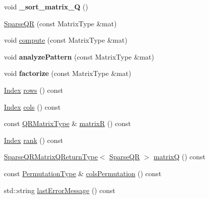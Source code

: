\begin{DoxyCompactItemize}
\mbox{\label{group___sparse_q_r___module_a056948dc591c1030164c2dda73664640}} 
void {\bfseries \+\_\+sort\+\_\+matrix\+\_\+Q} ()
\item 
\hyperlink{group___sparse_q_r___module_ac50f705d686d4bc687ce6acbc76447d2}{Sparse\+QR} (const Matrix\+Type \&mat)
\item 
void \hyperlink{group___sparse_q_r___module_aedaf52b7543de4d55c58c8f830c2aeb7}{compute} (const Matrix\+Type \&mat)
\item 
\mbox{\label{group___sparse_q_r___module_aaadce2d2140b517a8a7bf1ce59276f0a}} 
void {\bfseries analyze\+Pattern} (const Matrix\+Type \&mat)
\item 
\mbox{\label{group___sparse_q_r___module_a4308c8991861862af8c5ac7fec0ae149}} 
void {\bfseries factorize} (const Matrix\+Type \&mat)
\item 
\hyperlink{namespace_eigen_a62e77e0933482dafde8fe197d9a2cfde}{Index} \hyperlink{group___sparse_q_r___module_ab9133b7ace1c19714df99f553666316d}{rows} () const
\item 
\hyperlink{namespace_eigen_a62e77e0933482dafde8fe197d9a2cfde}{Index} \hyperlink{group___sparse_q_r___module_a57bedc9b1351c0995bae8ad0088a6fce}{cols} () const
\item 
const \hyperlink{group___sparse_core___module}{Q\+R\+Matrix\+Type} \& \hyperlink{group___sparse_q_r___module_a564524ff13b2b6dd1e76127404f7b920}{matrixR} () const
\item 
\hyperlink{namespace_eigen_a62e77e0933482dafde8fe197d9a2cfde}{Index} \hyperlink{group___sparse_q_r___module_a70ec2b9e5cb62a41dc1ee2adfb54e9b0}{rank} () const
\item 
\hyperlink{struct_eigen_1_1_sparse_q_r_matrix_q_return_type}{Sparse\+Q\+R\+Matrix\+Q\+Return\+Type}$<$ \hyperlink{group___sparse_q_r___module_class_eigen_1_1_sparse_q_r}{Sparse\+QR} $>$ \hyperlink{group___sparse_q_r___module_ae1cc0a836c177d4f42600f8639354be1}{matrixQ} () const
\item 
const \hyperlink{group___core___module}{Permutation\+Type} \& \hyperlink{group___sparse_q_r___module_a140930ebbf89dfd57a173761716db38f}{cols\+Permutation} () const
\item 
std\+::string \hyperlink{group___sparse_q_r___module_a1222e59649d77125d91f1368cf293c63}{last\+Error\+Message} () const
\item 

\end{DoxyCompactItemize}
